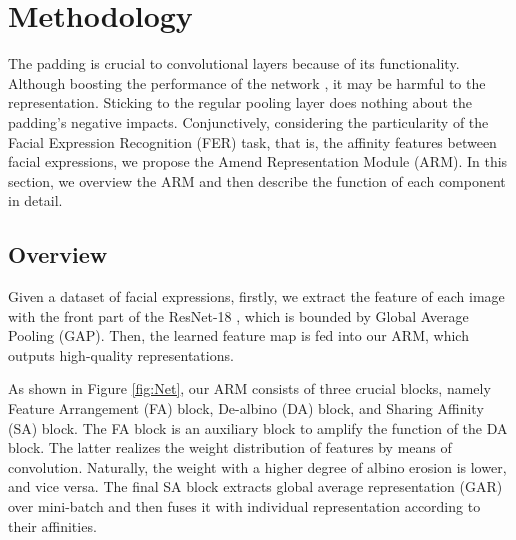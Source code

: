 \documentclass[10pt,twocolumn,letterpaper]{article}
\begin{document}
\section{Methodology}
	The padding is crucial to convolutional layers because of its functionality. Although boosting the performance of the network \cite{lecun, alexnet}, it may be harmful to the representation. Sticking to the regular pooling layer does nothing about the padding's negative impacts. Conjunctively, considering the particularity of the Facial Expression Recognition (FER) task, that is, the affinity features between facial expressions, we propose the Amend Representation Module (ARM). In this section, we overview the ARM and then describe the function of each component in detail.
\subsection{Overview}
	Given a dataset of facial expressions, firstly, we extract the feature of each image with the front part of the ResNet-18 \cite{resnet}, which is bounded by Global Average Pooling (GAP). Then, the learned feature map is fed into our ARM, which outputs high-quality representations.

	As shown in Figure \ref{fig:Net}, our ARM consists of three crucial blocks, namely Feature Arrangement (FA) block, De-albino (DA) block, and Sharing Affinity (SA) block. The FA block is an auxiliary block to amplify the function of the DA block. The latter realizes the weight distribution of features by means of convolution. Naturally, the weight with a higher degree of albino erosion is lower, and vice versa. The final SA block extracts global average representation (GAR) over mini-batch and then fuses it with individual representation according to their affinities. 
\end{document}
